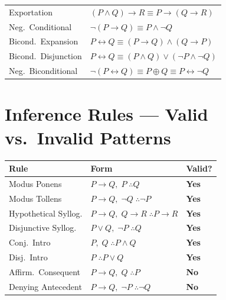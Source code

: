 \begin{center}
\begin{tabular}{l l}
Exportation           & $(P \wedge Q) \rightarrow R \equiv P \rightarrow (Q \rightarrow R)$ \\
Neg.\ Conditional     & $\neg(P \rightarrow Q) \equiv P \wedge \neg Q$ \\
Bicond.\ Expansion    & $P \leftrightarrow Q \equiv (P \rightarrow Q) \wedge (Q \rightarrow P)$ \\
Bicond.\ Disjunction  & $P \leftrightarrow Q \equiv (P \wedge Q) \vee (\neg P \wedge \neg Q)$ \\
Neg.\ Biconditional   & $\neg(P \leftrightarrow Q) \equiv P \oplus Q \equiv P \leftrightarrow \neg Q$ \\
\bottomrule
\end{tabular}
\end{center}

\section*{Inference Rules — Valid vs.\ Invalid Patterns}

\begin{center}
\renewcommand{\arraystretch}{1.3}
\begin{tabular}{l l l}
\toprule
\textbf{Rule} & \textbf{Form} & \textbf{Valid?} \\
\midrule
Modus Ponens         & $P \rightarrow Q,\; P \;\therefore Q$                & \textbf{Yes} \\
Modus Tollens        & $P \rightarrow Q,\; \neg Q \;\therefore \neg P$      & \textbf{Yes} \\
Hypothetical Syllog. & $P \rightarrow Q,\; Q \rightarrow R \;\therefore P \rightarrow R$ & \textbf{Yes} \\
Disjunctive Syllog.  & $P \vee Q,\; \neg P \;\therefore Q$                  & \textbf{Yes} \\
Conj.\ Intro         & $P,\; Q \;\therefore P \wedge Q$                     & \textbf{Yes} \\
Disj.\ Intro         & $P \;\therefore P \vee Q$                            & \textbf{Yes} \\
\midrule
Affirm.\ Consequent  & $P \rightarrow Q,\; Q \;\therefore P$                & \textbf{No} \\
Denying Antecedent   & $P \rightarrow Q,\; \neg P \;\therefore \neg Q$      & \textbf{No} \\
\bottomrule
\end{tabular}
\end{center}

